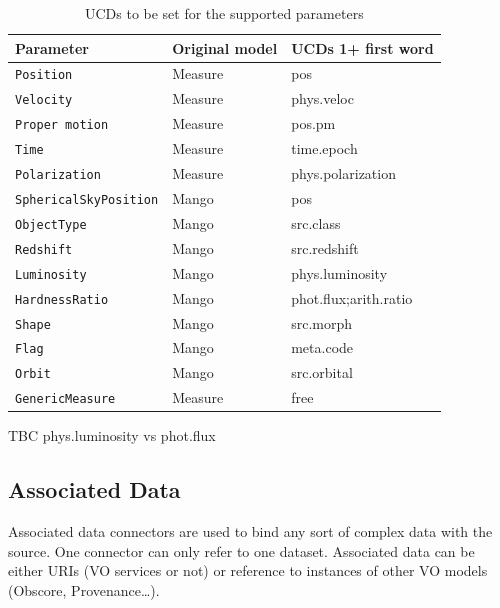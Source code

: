 \documentclass[11pt,a4paper]{ivoa}
\begin{document}
\begin{table}[ht!]
     \begin{tabular}{|p{4cm}|p{3cm}|p{3.5cm}|}
       \hline Parameter &  Original model & UCDs 1+ first word  \\
       \hline  \texttt{Position}             &  Measure  &  pos \\       
       \hline  \texttt{Velocity  }            &  Measure & phys.veloc      \\              
       \hline  \texttt{Proper motion}    & Measure & pos.pm    \\       
       \hline  \texttt{Time}                   & Measure &  time.epoch   \\       
       \hline  \texttt{Polarization}         & Measure & phys.polarization \\      
       \hline  \texttt{SphericalSkyPosition}    &  Mango  &  pos \\       
       \hline  \texttt{ObjectType}                   &  Mango  & src.class \\       
       \hline  \texttt{Redshift}                        &  Mango  & src.redshift \\       
       \hline  \texttt{Luminosity}                    &  Mango  & phys.luminosity \\
       \hline  \texttt{HardnessRatio}             &  Mango  & phot.flux;arith.ratio \\
       \hline  \texttt{Shape}                    &  Mango  & src.morph \\
       \hline  \texttt{Flag}                    &  Mango  & meta.code  \\
       \hline  \texttt{Orbit}                    &  Mango  & src.orbital\\    
       \hline  \texttt{GenericMeasure}                    &  Measure  &  free \\    
       \hline 
     \end{tabular}
     \caption{ UCDs to be set for the supported parameters} 
     \label{tab:ucds}
 \end{table}

TBC phys.luminosity  vs phot.flux

\subsection{Associated Data} 
Associated data connectors are used to bind any sort of complex data with the source. One connector can only refer to one dataset. Associated data can be either URIs (VO services or not) or reference to instances of other VO models (Obscore, Provenance…).
\end{document}
